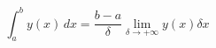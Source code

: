 \documentclass{article}
\begin{document}
\begin{equation}
\int_{a}^{b} y(x) \,dx = \frac{b-a}{\delta} \lim_{\delta \to +\infty} y(x) \delta x
\end{equation}
\end{document}
